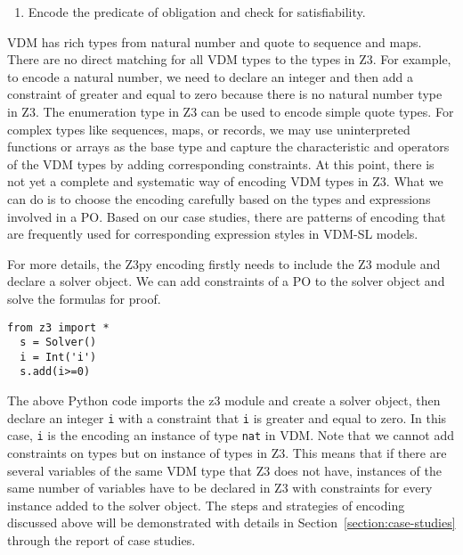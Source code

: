 \begin{enumerate}
\begin{enumerate}
\end{enumerate}
\item
Encode the predicate of obligation and check for satisfiability.
\end{enumerate}

VDM has rich types from natural number and quote to sequence and maps. There are no direct matching for all VDM types to the types in Z3. For example, to encode a natural number, we need to declare an integer and then add a constraint of greater and equal to zero because there is no natural number type in Z3. The enumeration type in Z3 can be used to encode simple quote types. For complex types like sequences, maps, or records, we may use uninterpreted functions or arrays as the base type and capture the characteristic and operators of the VDM types by adding corresponding constraints. At this point, there is not yet a complete and systematic way of encoding VDM types in Z3. What we can do is to choose the encoding carefully based on the types and expressions involved in a PO. Based on our case studies, there are patterns of encoding that are frequently used for corresponding expression styles in VDM-SL models.

For more details, the Z3py encoding firstly needs to include the Z3 module and declare a solver object. We can add constraints of a PO to the solver object and solve the formulas for proof.

\begin{mdframed}[roundcorner=5pt,shadow=true]
\begin{Verbatim}[fontsize=\small]
  from z3 import *
  s = Solver()
  i = Int('i')
  s.add(i>=0)
\end{Verbatim}
\end{mdframed}

The above Python code imports the z3 module and create a solver object, then declare an integer {\tt i} with a constraint that {\tt i} is greater and equal to zero. In this case, {\tt i} is the encoding an instance of type {\tt nat} in VDM. Note that we cannot add constraints on types but on instance of types in Z3. This means that if there are several variables of the same VDM type that Z3 does not have, instances of the same number of variables have to be declared in Z3 with constraints for every instance added to the solver object. The steps and strategies of encoding discussed above will be demonstrated with details in Section~\ref{section:case-studies} through the report of case studies.


